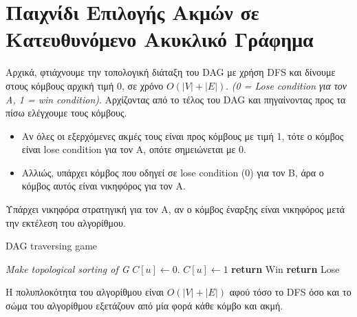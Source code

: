 \documentclass[a4paper,11pt]{article}
\begin{document}
\renewcommand{\labelenumi}{\roman{enumi})}
\renewcommand{\labelenumii}{ (\arabic{enumii}) }



\section{Παιχνίδι Επιλογής Ακμών σε Κατευθυνόμενο Ακυκλικό Γράφημα} \setcounter{section}{1}

Αρχικά, φτιάχνουμε την τοπολογική διάταξη του DAG με χρήση DFS και δίνουμε
στους κόμβους αρχική τιμή 0, σε χρόνο $O(|V| + |E|)$. \emph{(0 = Lose
condition για τον Α, 1 = win condition)}. Αρχίζοντας από το τέλος του DAG και
πηγαίνοντας προς τα πίσω ελέγχουμε τους κόμβους.
\begin{itemize}
\item
Αν όλες οι εξερχόμενες ακμές τους είναι προς κόμβους με τιμή 1, τότε ο κόμβος
είναι lose condition για τον Α, οπότε σημειώνεται με 0.
\item
Αλλιώς, υπάρχει κόμβος που οδηγεί σε lose condition (0) για τον Β, άρα ο κόμβος
αυτός είναι νικηφόρος για τον Α.
\end{itemize}

Υπάρχει νικηφόρα στρατηγική για τον Α, αν ο κόμβος έναρξης είναι νικηφόρος
μετά την εκτέλεση του αλγορίθμου.

\begin{algorithm}[H]
\caption{DAG traversing game}
\begin{algorithmic}[1]
	\State \emph{Make topological sorting of G}
		\State $C[u] \gets 0$.
	\EndFor
				\State $C[u] \gets 1$
			\EndIf
		\EndFor
	\EndFor
		\State \textbf{return} Win
	\Else
		\State \textbf{return} Lose
	\EndIf
\EndProcedure
\end{algorithmic}
\end{algorithm}

Η πολυπλοκότητα του αλγορίθμου είναι $O(|V| + |E|)$ αφού τόσο το DFS όσο και
το σώμα του αλγορίθμου εξετάζουν από μία φορά κάθε κόμβο και ακμή.


\end{document}
